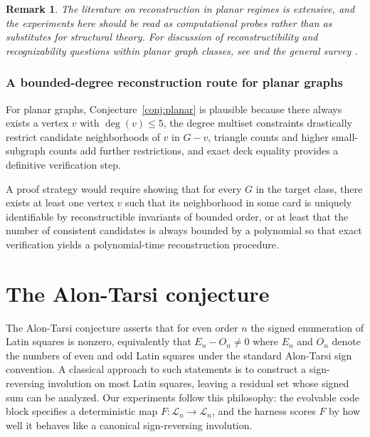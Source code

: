 \documentclass[11pt]{amsart}
\newtheorem{remark}{Remark}
\begin{document}
\begin{remark}
The literature on reconstruction in planar regimes is extensive, and the experiments here should be read as computational probes rather than as substitutes for structural theory.
For discussion of reconstructibility and recognizability questions within planar graph classes, see \cite{BilinskiKwonYu2007} and the general survey \cite{BondyHemminger1977}.
\end{remark}



\subsubsection{A bounded-degree reconstruction route for planar graphs}
For planar graphs, Conjecture~\ref{conj:planar} is plausible because there always exists a vertex $v$ with $\deg(v)\le 5$, the degree multiset constraints drastically restrict candidate neighborhoods of $v$ in $G-v$, triangle counts and higher small-subgraph counts add further restrictions, and exact deck equality provides a definitive verification step.

A proof strategy would require showing that for every $G$ in the target class, there exists at least one vertex $v$ such that its neighborhood in some card is uniquely identifiable by reconstructible invariants of bounded order, or at least that the number of consistent candidates is always bounded by a polynomial so that exact verification yields a polynomial-time reconstruction procedure.

\section{The Alon-Tarsi conjecture}
\label{sec:partIIintro}

The Alon-Tarsi conjecture asserts that for even order $n$ the signed enumeration of Latin squares is nonzero, equivalently that $E_n-O_n\neq 0$ where $E_n$ and $O_n$ denote the numbers of even and odd Latin squares under the standard Alon-Tarsi sign convention.
A classical approach to such statements is to construct a sign-reversing involution on most Latin squares, leaving a residual set whose signed sum can be analyzed.
Our experiments follow this philosophy: the evolvable code block specifies a deterministic map $F:\mathcal{L}_n\to\mathcal{L}_n$, and the harness scores $F$ by how well it behaves like a canonical sign-reversing involution.
\end{document}
